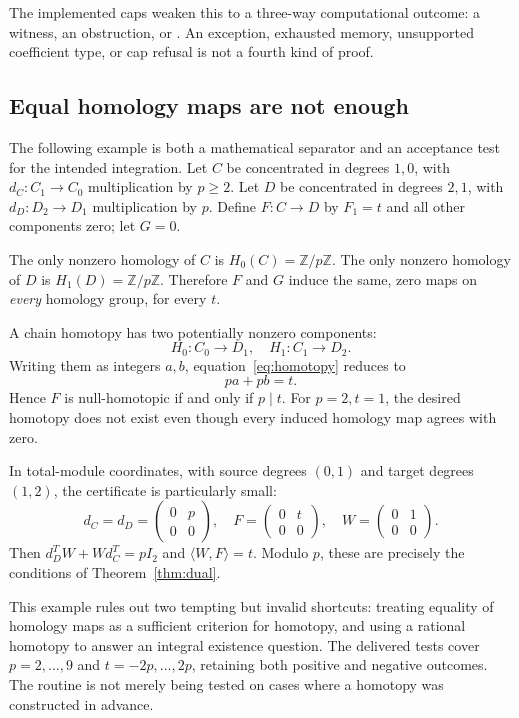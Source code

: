 \documentclass[11pt,letterpaper]{article}
\theoremstyle{definition}\newtheorem{definition}[theorem]{Definition}
\theoremstyle{remark}\newtheorem{remark}[theorem]{Remark}
\newcommand{\Z}{\mathbb Z}\newcommand{\Q}{\mathbb Q}
\newcommand{\code}[1]{\texttt{\detokenize{#1}}}
\newcommand{\pair}[2]{\langle #1,#2\rangle}
\begin{document}
The implemented caps weaken this to a three-way computational outcome:
a witness, an obstruction, or \code{UNKNOWN}. An exception, exhausted memory,
unsupported coefficient type, or cap refusal is not a fourth kind of proof.

\subsection{Equal homology maps are not enough}
\label{sec:secondary}
The following example is both a mathematical separator and an acceptance test
for the intended integration. Let $C$ be concentrated in degrees $1,0$, with
$d_C:C_1\to C_0$ multiplication by $p\geq2$. Let $D$ be concentrated in degrees
$2,1$, with $d_D:D_2\to D_1$ multiplication by $p$. Define $F:C\to D$ by
$F_1=t$ and all other components zero; let $G=0$.

The only nonzero homology of $C$ is $H_0(C)=\Z/p\Z$. The only nonzero homology
of $D$ is $H_1(D)=\Z/p\Z$. Therefore $F$ and $G$ induce the same, zero maps on
\emph{every} homology group, for every $t$.

A chain homotopy has two potentially nonzero components:
\[
 H_0:C_0\to D_1,\quad H_1:C_1\to D_2.
\]
Writing them as integers $a,b$, equation~\eqref{eq:homotopy} reduces to
\begin{equation}\label{eq:secondary}
 p a+p b=t.
\end{equation}
Hence $F$ is null-homotopic if and only if $p\mid t$.
For $p=2,t=1$, the desired homotopy does not exist even though every induced
homology map agrees with zero.

In total-module coordinates, with source degrees $(0,1)$ and target degrees
$(1,2)$, the certificate is particularly small:
\[
 d_C=d_D=\begin{pmatrix}0&p\\0&0\end{pmatrix},\quad
 F=\begin{pmatrix}0&t\\0&0\end{pmatrix},\quad
 W=\begin{pmatrix}0&1\\0&0\end{pmatrix}.
\]
Then $d_D^TW+Wd_C^T=pI_2$ and $\pair{W}{F}=t$.
Modulo $p$, these are precisely the conditions of Theorem~\ref{thm:dual}.

This example rules out two tempting but invalid shortcuts: treating equality
of homology maps as a sufficient criterion for homotopy, and using a rational
homotopy to answer an integral existence question. The delivered tests cover
$p=2,\ldots,9$ and $t=-2p,\ldots,2p$, retaining both positive and negative
outcomes. The routine is not merely being tested on cases where a homotopy
was constructed in advance.
\end{document}
